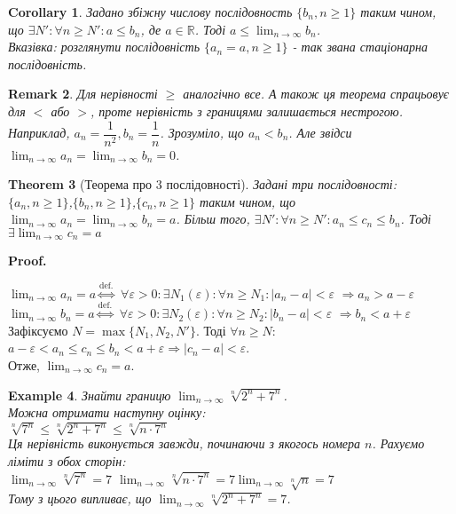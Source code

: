 \documentclass[a4paper, 14pt]{article}
\makeatletter
\def\huge{\displaystyle}
\def\qed{$\blacksquare$}
\theoremstyle{theoremdd}
\newtheorem{theorem}{Theorem}[subsection]
\theoremstyle{theoremdd}
\theoremstyle{theoremdd}
\theoremstyle{theoremdd}
\newtheorem{example}[theorem]{Example}
\theoremstyle{theoremdd}
\theoremstyle{theoremdd}
\newtheorem{remark}[theorem]{Remark}
\theoremstyle{theoremdd}
\theoremstyle{theoremdd}
\newtheorem{corollary}[theorem]{Corollary}
\renewenvironment{proof}[1][Proof.\\]{\par
\pushQED{\hfill \qed}%
\normalfont \topsep6\p@\@plus6\p@\relax
\trivlist
\item\relax
{\bfseries
#1\@addpunct{.}}\hspace\labelsep\ignorespaces
}{%
\popQED\endtrivlist\@endpefalse
}
\makeatother
\begin{document}
	\begin{corollary}
	Задано збіжну числову послідовность $\{b_n, n \geq 1\}$ таким чином, що $\exists N': \forall n \geq N': a \leq b_n$, де $a \in \mathbb{R}$. Тоді $\displaystyle a \leq \lim_{n \to \infty} b_n$.\\
	\textit{Вказівка: розглянути послідовність $\{a_n = a, n \geq 1\}$ - так звана стаціонарна послідовність.}
	\end{corollary}
	
	\begin{remark}
	Для нерівності $\geq$ аналогічно все. А також ця теорема спрацьовує для $<$ або $>$, проте нерівність з границями залишається нестрогою.\\
	Наприклад, $a_n = \dfrac{1}{n^2}, b_n = \dfrac{1}{n}$. Зрозуміло, що $a_n < b_n$. Але звідси $\huge\lim_{n \to \infty} a_n = \huge\lim_{n \to \infty} b_n = 0$.
	\end{remark}
	
	\begin{theorem}[Теорема про 3 послідовності]
	Задані три послідовності: $\{a_n, n \geq 1\}$,$\{b_n, n \geq 1\}$,$\{c_n, n \geq 1\}$ таким чином, що $\displaystyle \lim_{n \to \infty} a_n = \displaystyle \lim_{n \to \infty} b_n = a$. Більш того, $\exists N': \forall n \geq N': a_n \leq c_n \leq b_n$.
	Тоді $\exists \displaystyle \lim_{n \to \infty} c_n = a$
	\end{theorem}
	
	\begin{proof}
	$\displaystyle \lim_{n \to \infty} a_n = a \overset{\textrm{def.}}{\iff}$ $\forall \varepsilon > 0: \exists N_1(\varepsilon): \forall n \geq N_1: |a_n-a| < \varepsilon$ $\Rightarrow a_n > a - \varepsilon$\\
	$\displaystyle \lim_{n \to \infty} b_n = a \overset{\textrm{def.}}{\iff}$ $\forall \varepsilon > 0: \exists N_2(\varepsilon): \forall n \geq N_2: |b_n-a| < \varepsilon$ $\Rightarrow b_n<a+\varepsilon$\\
	Зафіксуємо $N=\max\{N_1, N_2, N'\}$. Тоді $\forall n \geq N:$\\
	$a-\varepsilon< a_n \leq c_n \leq b_n < a+\varepsilon \Rightarrow |c_n - a|<\varepsilon$.\\
	Отже, $\displaystyle \lim_{n \to \infty} c_n = a$.
	\end{proof}
	
	\begin{example}
	Знайти границю $\displaystyle \lim_{n \to \infty} \sqrt[n]{2^n+7^n}$.\\
	Можна отримати наступну оцінку:\\
	$\sqrt[n]{7^n} \leq \sqrt[n]{2^n+7^n} \leq \sqrt[n]{n\cdot 7^n}$\\
	Ця нерівність виконується завжди, починаючи з якогось номера $n$. Рахуємо ліміти з обох сторін:\\
	$\displaystyle \lim_{n \to \infty} \sqrt[n]{7^n} = 7$ \hspace{1cm}
	$\displaystyle \lim_{n \to \infty} \sqrt[n]{n \cdot 7^n} = 7 \lim_{n \to \infty} \sqrt[n]{n} = 7$\\
	Тому з цього випливає, що $\displaystyle \lim_{n \to \infty} \sqrt[n]{2^n+7^n} = 7$.
	\end{example}
	
\end{document}
